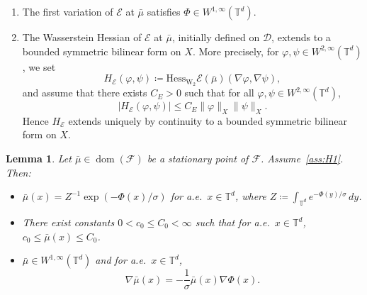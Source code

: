 \documentclass[10pt,a4paper]{amsart}
\newtheorem{lemma}{Lemma}
\newcommand{\E}{\mathcal{E}}
\newcommand{\F}{\mathcal{F}}
\newcommand{\T}{\mathbb{T}}
\newcommand{\Wtwo}{\operatorname{W}_2}
\begin{document}
\begin{enumerate}[label=(H\arabic*),ref=(H\arabic*)]
    \item\label{ass:H1} The first variation of $\E$ at $\bar\mu$ satisfies $\Phi \in W^{1,\infty}(\T^d)$.

    \item\label{ass:H2} The Wasserstein Hessian of $\E$ at $\bar\mu$, initially defined on $\mathscr{D}$, extends to a bounded symmetric bilinear form on $X$.
    More precisely, for $\varphi, \psi \in W^{2,\infty}(\T^d)$, we set
    \[
    H_\E(\varphi,\psi) \coloneqq \mathrm{Hess}_{\Wtwo} \E(\bar\mu)(\nabla\varphi,\nabla\psi), 
    \]
    and assume that there exists $C_E > 0$ such that for all $\varphi, \psi \in W^{2,\infty}(\T^d)$, 
    \[
    |H_\E(\varphi,\psi)| \le C_E\|\varphi\|_X\|\psi\|_X. 
    \]
    Hence $H_\E$ extends uniquely by continuity to a bounded symmetric bilinear form on $X$.
\end{enumerate}

\begin{lemma}
    \label{lem:mu_bar_bounds}
    Let $\bar\mu \in \operatorname{dom}(\F)$ be a stationary point of $\F$.
    Assume~\ref{ass:H1}.
    Then:
    \begin{itemize}
        \item[(i)] $\bar\mu(x) = Z^{-1}\exp(-\Phi(x)/\sigma)$ for a.e.\ $x\in\T^d$, where $Z \coloneqq \int_{\T^d} e^{-\Phi(y)/\sigma}\,dy$.
        \item[(ii)] There exist constants $0 < c_0 \le C_0 < \infty$ such that for a.e.\ $x \in \T^d$, $c_0 \le \bar\mu(x) \le C_0$.
        \item[(iii)] $\bar\mu\in W^{1,\infty}(\T^d)$ and for a.e.\ $x\in\T^d$,
        \begin{equation}
            \label{eq:derivative_barmu}
            \nabla\bar\mu(x) = -\frac{1}{\sigma} \bar\mu(x) \nabla\Phi(x). 
        \end{equation}
    \end{itemize}
\end{lemma}
\end{document}
